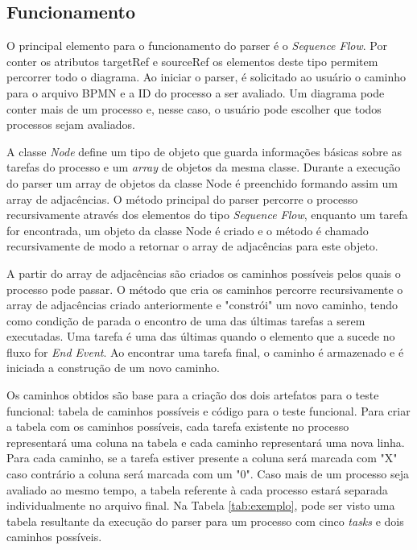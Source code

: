 \documentclass[12pt]{article}
\begin{document}
\subsection{Funcionamento}
O principal elemento para o funcionamento do parser é o \emph{Sequence Flow}. Por conter os atributos targetRef e sourceRef os elementos deste tipo permitem percorrer todo o diagrama. Ao iniciar o parser, é solicitado ao usuário o caminho para o arquivo BPMN e a ID do processo a ser avaliado. Um diagrama pode conter mais de um processo e, nesse caso, o usuário pode escolher que todos processos sejam avaliados.

A classe \emph{Node} define um tipo de objeto que guarda informações básicas sobre as tarefas do processo e um \emph{array} de objetos da mesma classe. Durante a execução do parser um array de objetos da classe Node é preenchido formando assim um array de adjacências. O método principal do parser percorre o processo recursivamente através dos elementos do tipo \emph{Sequence Flow}, enquanto um tarefa for encontrada, um objeto da classe Node é criado e o método é chamado recursivamente de modo a retornar o array de adjacências para este objeto.

A partir do array de adjacências são criados os caminhos possíveis pelos quais o processo pode passar. O método que cria os caminhos percorre recursivamente o array de adjacências criado anteriormente e "constrói" um novo caminho, tendo como condição de parada o encontro de uma das últimas tarefas a serem executadas. Uma tarefa é uma das últimas quando o elemento que a sucede no fluxo for \emph{End Event}. Ao encontrar uma tarefa final, o caminho é armazenado e é iniciada a construção de um novo caminho.

Os caminhos obtidos são base para a criação dos dois artefatos para o teste funcional: tabela de caminhos possíveis e código para o teste funcional. Para criar a tabela com os caminhos possíveis, cada tarefa existente no processo representará uma coluna na tabela e cada caminho representará uma nova linha. Para cada caminho, se a tarefa estiver presente a coluna será marcada com "X" caso contrário a coluna será marcada com um "0". Caso mais de um processo seja avaliado ao mesmo tempo, a tabela referente à cada processo estará separada individualmente no arquivo final. Na Tabela \ref{tab:exemplo}, pode ser visto uma tabela resultante da execução do parser para um processo com cinco \emph{tasks} e dois caminhos possíveis. 
\end{document}
